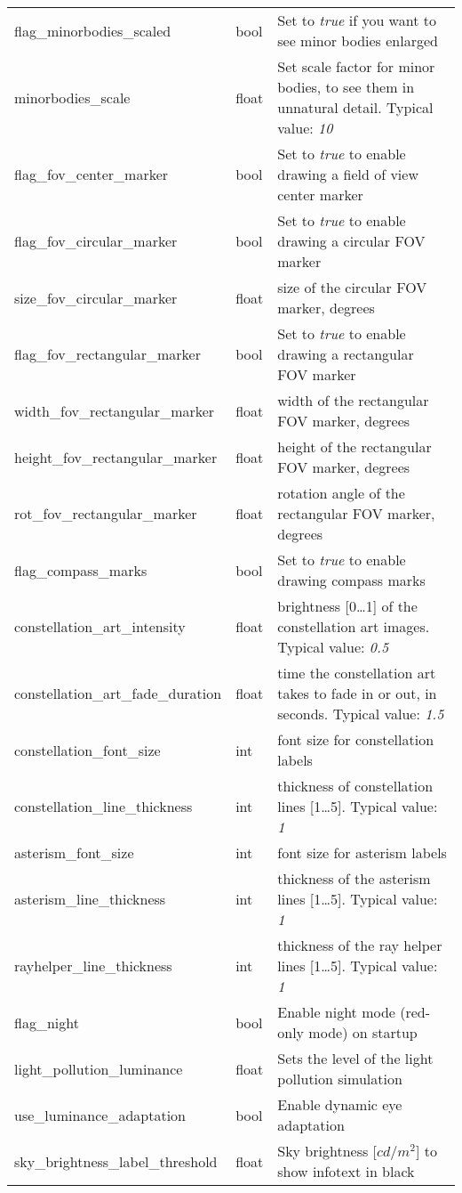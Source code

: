 \begin{longtable}{l|l|p{77mm}}
flag\_minorbodies\_scaled     & bool & Set to \emph{true} if you want to see minor bodies enlarged \\
minorbodies\_scale            & float & Set scale factor for minor bodies, to see them in unnatural detail. Typical value: \emph{10}\\
\midrule
flag\_fov\_center\_marker        & bool  & Set to \emph{true} to enable drawing a field of view center marker \\
flag\_fov\_circular\_marker      & bool  & Set to \emph{true} to enable drawing a circular FOV marker \\
size\_fov\_circular\_marker      & float & size of the circular FOV marker, degrees \\
flag\_fov\_rectangular\_marker   & bool  & Set to \emph{true} to enable drawing a rectangular FOV marker \\
width\_fov\_rectangular\_marker  & float & width of the rectangular FOV marker, degrees \\
height\_fov\_rectangular\_marker & float & height of the rectangular FOV marker, degrees \\
rot\_fov\_rectangular\_marker    & float & rotation angle of the rectangular FOV marker, degrees \\
flag\_compass\_marks             & bool  & Set to \emph{true} to enable drawing compass marks \\
\midrule
constellation\_art\_intensity      & float & brightness [0\ldots1] of the constellation art images. Typical value: \emph{0.5}\\%
constellation\_art\_fade\_duration & float & time the constellation art takes to fade in or out, in seconds. Typical value: \emph{1.5}\\%
constellation\_font\_size          & int   & font size for constellation labels\\%
constellation\_line\_thickness     & int   & thickness of constellation lines [1\ldots5]. Typical value: \emph{1}\\%
asterism\_font\_size               & int   & font size for asterism labels\\%
asterism\_line\_thickness          & int   & thickness of the asterism lines [1\ldots5]. Typical value: \emph{1}\\%
rayhelper\_line\_thickness         & int   & thickness of the ray helper lines [1\ldots5]. Typical value: \emph{1}\\\midrule
flag\_night                        & bool  & Enable night mode (red-only mode) on startup\\\midrule
light\_pollution\_luminance        & float & Sets the level of the light pollution simulation\\\midrule %
use\_luminance\_adaptation         & bool  & Enable dynamic eye adaptation\\\midrule %
sky\_brightness\_label\_threshold  & float & Sky brightness [$cd/m^2$] to show infotext in black \\ %
\bottomrule
\end{longtable}



